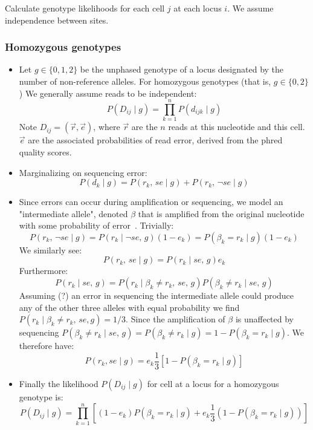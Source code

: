 \documentclass[../../main.tex]{subfiles}
\begin{document}
Calculate genotype likelihoods for each cell $j$ at each locus $i$. We assume independence between sites.
\subsubsection*{Homozygous genotypes}
\begin{itemize}
    \item Let $g\in\{0,1,2\}$ be the unphased genotype of a locus designated by the number of non-reference alleles. For homozygous genotypes (that is, $g\in\{0,2\}$) We generally assume reads to be independent:
    \begin{equation}
        P(D_{ij}\mid g) = \prod_{k=1}^n P(d_{ijk} \mid g)
    \end{equation}
    Note $D_{ij}=(\vec{r},\vec{e})$, where $\vec{r}$ are the $n$ reads at this nucleotide and this cell. $\vec{e}$ are the associated probabilities of read error, derived from the phred quality scores.\\
    \item Marginalizing on sequencing error:
    \begin{equation*}
        P(d_k \mid g) =  P(r_k,\,se \mid g) + P(r_k,\,\neg se \mid g)
    \end{equation*}
    \item Since errors can occur during amplification or sequencing, we model an "intermediate allele", denoted $\beta$ that is amplified from the original nucleotide with some probability of error~\cite{monovar}. Trivially:
    \begin{equation*}
        P(r_k,\,\neg se \mid g) = P(r_k\mid \neg se ,\, g)(1-e_k)=P(\beta_k=r_k\mid g)(1-e_k) 
    \end{equation*}
    We similarly see:
    \begin{equation*}
        P(r_k,\, se \mid g) = P(r_k\mid se,\, g)e_k
    \end{equation*}
    Furthermore:
    \begin{equation*}
        P(r_k\mid se,\, g) = P(r_k\mid \beta_k\neq r_k,\,se,\,g) P(\beta_k\neq r_k \mid se,\,g)
    \end{equation*}
     Assuming (?) an error in sequencing the intermediate allele could produce any of the other three alleles with equal probability we find $P(r_k\mid \beta_k \neq r_k,\,se,g)=1/3$. Since the amplification of $\beta$ is unaffected by sequencing $P(\beta_k\neq r_k \mid se,\,g)=P(\beta_k\neq r_k\mid g)=1-P(\beta_k=r_k\mid g)$. We therefore have:
     \begin{equation*}
         P(r_k, se \mid g) = e_k \frac{1}{3}\left[1-P(\beta_k=r_k\mid g)\right]
     \end{equation*}
     \item Finally the likelihood $P(D_{ij}\mid g)$ for cell at a locus for a homozygous genotype is:
     \begin{equation}
          P(D_{ij}\mid g) = \prod_{k=1}^n \left[ (1-e_k)P(\beta_k=r_k\mid g) + e_k \frac{1}{3} (1-P(\beta_k=r_k\mid g)) \right]
     \end{equation}
\end{itemize}
\end{document}
